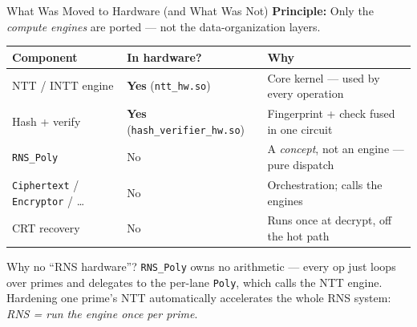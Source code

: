 \documentclass[aspectratio=169, 11pt]{beamer}
\begin{document}
\begin{frame}{What Was Moved to Hardware (and What Was Not)}
\textbf{Principle:} Only the \emph{compute engines} are ported --- not the data-organization layers.

\vspace{0.5em}
\begin{center}
\small
\begin{tabular}{@{}lll@{}}
\toprule
\textbf{Component} & \textbf{In hardware?} & \textbf{Why} \\
\midrule
NTT / INTT engine & \textbf{Yes} (\texttt{ntt\_hw.so}) & Core kernel --- used by every operation \\
Hash + verify & \textbf{Yes} (\texttt{hash\_verifier\_hw.so}) & Fingerprint + check fused in one circuit \\
\midrule
\texttt{RNS\_Poly} & No & A \emph{concept}, not an engine --- pure dispatch \\
\texttt{Ciphertext} / \texttt{Encryptor} / \dots & No & Orchestration; calls the engines \\
CRT recovery & No & Runs once at decrypt, off the hot path \\
\bottomrule
\end{tabular}
\end{center}

\vspace{0.5em}
\begin{block}{Why no ``RNS hardware''?}
\texttt{RNS\_Poly} owns no arithmetic --- every op just loops over primes and delegates to
the per-lane \texttt{Poly}, which calls the NTT engine. Hardening one prime's NTT
automatically accelerates the whole RNS system: \emph{RNS = run the engine once per prime}.
\end{block}
\end{frame}
\end{document}
